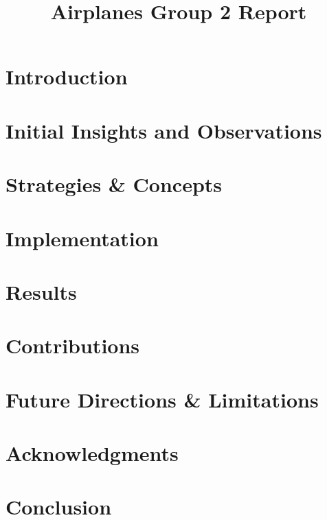 \documentclass[10pt]{article}
\title{Airplanes Group 2 Report}
\author{\myname}
\begin{document}
\pagestyle{empty}
\maketitle

\newpage
\pagestyle{fancy}
\setlength\headheight{60pt}
\setcounter{tocdepth}{3}
\tableofcontents

\newpage
\section{Introduction}

\newpage
\section{Initial Insights and Observations}

\newpage
\section{Strategies & Concepts}

\newpage
\section{Implementation}

\newpage
\section{Results}

\newpage
\section{Contributions}

\newpage
\section{Future Directions & Limitations}

\newpage
\section{Acknowledgments}

\newpage
\section{Conclusion}
  
\end{document}
